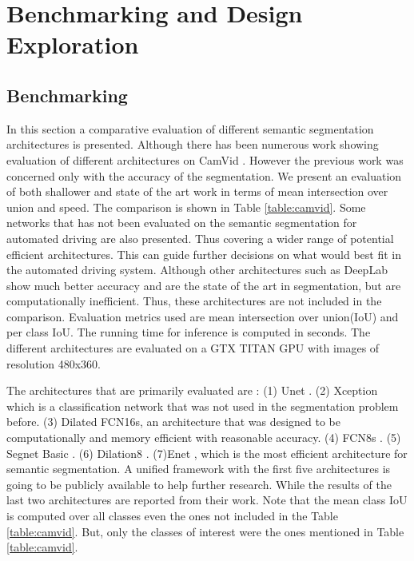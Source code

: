 \documentclass[conference]{IEEEtran}
\begin{document}

\section{Benchmarking and Design Exploration}\label{sec:results}
\subsection{Benchmarking}
In this section a comparative evaluation of different semantic segmentation architectures is presented. Although there has been numerous work showing evaluation of different architectures on CamVid \cite{brostow2008segmentation}. However the previous work was concerned only with the accuracy of the segmentation. We present an evaluation of both shallower and state of the art work in terms of mean intersection over union and speed. The comparison is shown in Table \ref{table:camvid}. Some networks that has not been evaluated on the semantic segmentation for automated driving are also presented. Thus covering a wider range of potential efficient architectures. This can guide further decisions on what would best fit in the automated driving system. Although other architectures such as DeepLab\cite{chen2016deeplab} show much better accuracy and are the state of the art in segmentation, but are computationally inefficient. Thus, these architectures are not included in the comparison. Evaluation metrics used are mean intersection over union(IoU) and per class IoU. The running time for inference is computed in seconds. The different architectures are evaluated on a GTX TITAN GPU with images of resolution 480x360. 

The architectures that are primarily evaluated are : (1) Unet \cite{ronneberger2015u}. (2) Xception \cite{chollet2016xception} which is a classification network that was not used in the segmentation problem before. (3) Dilated FCN16s, an architecture that was designed to be computationally and memory efficient with reasonable accuracy. (4) FCN8s \cite{long2015fully}. (5) Segnet Basic \cite{badrinarayanan2015segnet}. (6) Dilation8 \cite{yu2015multi}. (7)Enet \cite{paszke2016enet}, which is the most efficient architecture for semantic segmentation. A unified framework with the first five architectures is going to be publicly available to help further research. While the results of the last two architectures are reported from their work. Note that the mean class IoU is computed over all classes even the ones not included in the Table \ref{table:camvid}. But, only the classes of interest were the ones mentioned in Table \ref{table:camvid}.
\end{document}
